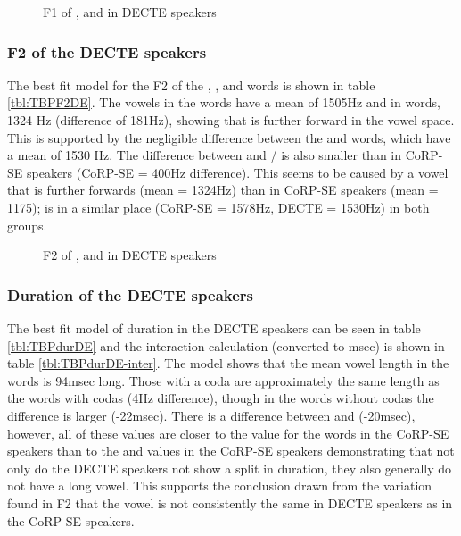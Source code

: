 \documentclass[../../../00.FullDoc/tex/APRReport-year4]{subfiles}
\begin{document}
\begin{figure}[h]
	
	\caption{F1 of \trap{}, \bath{} and \palm{}  in DECTE speakers} \label{fig:TBF1DE}
\end{figure}

\subsubsection{F2 of the DECTE speakers}
The best fit model for the F2 of the \trap{}, \bath{}, and \palm{} words is shown in table \ref{tbl:TBPF2DE}. The vowels in the \bath{} words have a mean of 1505Hz and  in \palm{} words, 1324 Hz (difference of 181Hz), showing that \bath{} is further forward in the vowel space. This is supported by the negligible difference between the \bath{} and \trap{} words, which have a mean of 1530 Hz. The difference between \palm{} and \trap{}/\bath{} is also smaller than in CoRP-SE speakers (CoRP-SE = 400Hz difference). This seems to be caused by a \palm{} vowel that is further forwards (mean = 1324Hz) than in CoRP-SE speakers (mean = 1175); \trap{} is in a similar place (CoRP-SE = 1578Hz, DECTE = 1530Hz) in both groups. 



\begin{figure}[h]
	
	\caption{F2 of \trap{}, \bath{} and \palm{}  in DECTE speakers} \label{fig:TBF2DE}
\end{figure}


\subsubsection{Duration of the DECTE speakers}

The best fit model of duration in the DECTE speakers can be seen in table \ref{tbl:TBPdurDE} and the interaction calculation (converted to msec) is shown in table \ref{tbl:TBPdurDE-inter}. The model shows that the mean vowel length in the \bath{} words is 94msec long. Those with a coda are approximately the same length as the \trap{} words with codas (4Hz difference), though in the words without codas the difference is larger (-22msec). There is a difference between \trap{} and \palm{} (-20msec), however, all of these values are closer to the value for the \trap{} words in the CoRP-SE speakers than to the \palm{} and \bath{} values in the CoRP-SE speakers demonstrating that not only do the DECTE speakers not show a \TB{} split in duration, they also generally do not have a long \palm{} vowel. This supports the conclusion drawn from the variation found in F2 that the \palm{} vowel is not consistently the same in DECTE speakers as in the CoRP-SE speakers.
\end{document}
